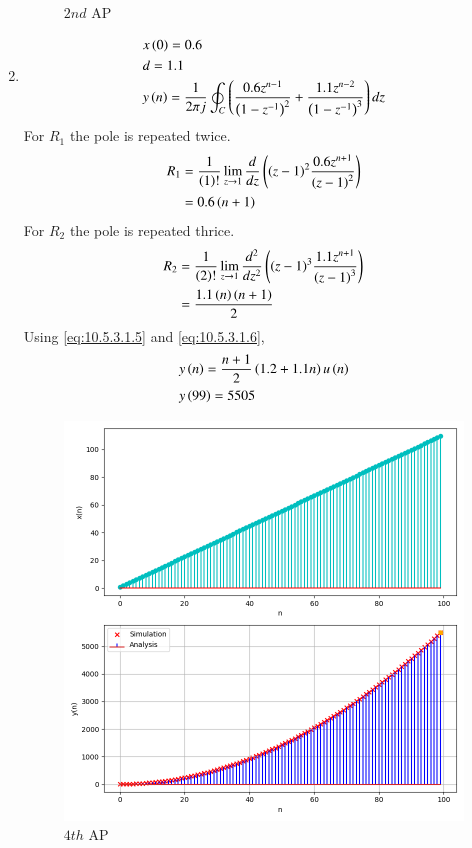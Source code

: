 \documentclass[journal,12pt,twocolumn]{IEEEtran}
\theoremstyle{remark}
\begin{document}
\begin{enumerate}[label=(\alph*)]
\begin{figure}[h!]
        \caption{$2nd$ AP}
    \end{figure}
    \item \begin{align}
        &x\left(0\right)=0.6 \\
        &d=1.1 \\
        &y\left(n\right)=\frac{1}{2\pi j}\oint_{C}\left(\dfrac{0.6z^{n-1}}{\left(1-z^{-1}\right)^2} + \dfrac{1.1z^{n-2}}{\left(1-z^{-1}\right)^{3}}\right)dz
    \end{align}
    For $R_1$ the pole is repeated twice.
\begin{align}
    R_1&=\frac{1}{\left(1\right)!}\lim\limits_{z\to 1}\frac{d}{dz}\left({\left(z-1\right)}^{2}\frac{0.6z^{n+1}}{{\left(z-1\right)}^2}\right)\\
    &=0.6\left(n+1\right)\label{eq:10.5.3.1.5}
\end{align}
    For $R_2$ the pole is repeated thrice.
\begin{align}
    R_2&=\frac{1}{\left(2\right)!}\lim\limits_{z\to 1}\frac{d^{2}}{dz^{2}}\left({\left(z-1\right)}^{3}\frac{1.1z^{n+1}}{{\left(z-1\right)}^3}\right)\\
    &=\frac{1.1\left(n\right)\left(n+1\right)}{2}\label{eq:10.5.3.1.6}
\end{align}
Using \eqref{eq:10.5.3.1.5} and \eqref{eq:10.5.3.1.6},
\begin{align}
    &y\left(n\right)=\dfrac{n+1}{2}\left(1.2+1.1n\right)u\left(n\right)\\
    &y\left(99\right)=5505
\end{align}
    \begin{figure}[h!]
        \centering
        \includegraphics[width=\columnwidth]{figs/plt3.png}
        \caption{$4th$ AP}
    \end{figure}


\end{enumerate}
\end{document}
